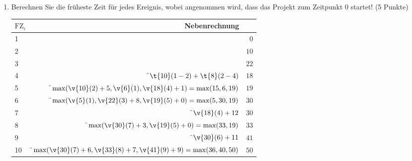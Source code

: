 \documentclass{lehramt-informatik}
\begin{document}
\begin{center}
\end{center}

\begin{enumerate}


\item Berechnen Sie die früheste Zeit für jedes Ereignis, wobei
angenommen wird, dass das Projekt zum Zeitpunkt 0 startet! (5 Punkte)

\begin{antwort}
\begin{tabular}{|l|r|r|}
\hline
$\text{FZ}_i$ & Nebenrechnung & \\\hline\hline
1 &                                                                           & $0$ \\\hline
2 &                                                                           & $10$ \\\hline
3 &                                                                           & $22$ \\\hline
4 & \f$\t{10}(1-2) + \t{8}(2-4) $                                             & $18$ \\\hline
5 & \f$\max(\v{10}(2) + 5,\v{6}(1),\v{18}(4) + 1) = \max(15,6,19)$            & $19$ \\\hline
6 & \f$\max(\v{5}(1),\v{22}(3) + 8, \v{19}(5) + 0) = \max(5, 30, 19)$         & $30$ \\\hline
7 & \f$\v{18}(4) + 12$                                                        & $30$ \\\hline
8 & \f$\max(\v{30}(7) + 3, \v{19}(5) + 0) = \max(33,19)$                      & $33$ \\\hline
9 & \f$\v{30}(6) + 11$                                                        & $41$ \\\hline
10 & \f$\max(\v{30}(7) + 6, \v{33}(8) + 7, \v{41}(9) + 9) = \max(36, 40, 50)$ & $50$ \\\hline
\end{tabular}
\end{antwort}


\end{enumerate}
\end{document}
